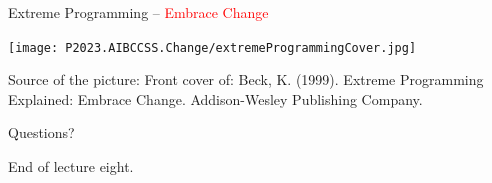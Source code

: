 \documentclass{beamer}
\begin{document}
\begin{frame}
{\centerline{Extreme Programming -- \textcolor{red}{Embrace Change}}}

\begin{center}
 \texttt{[image: P2023.AIBCCSS.Change/extremeProgrammingCover.jpg]}
 
 \end{center}
 
 \begin{center}
\tiny
Source of the picture: Front cover of: Beck, K. (1999). Extreme Programming Explained: Embrace Change. Addison-Wesley Publishing Company.
\end{center}


\end{frame}


\begin{frame}
{\centerline{Questions?}}

\vspace{1cm}
\begin{center}
    \LARGE{End of lecture eight.}
\end{center}

\end{frame}
\end{document}
